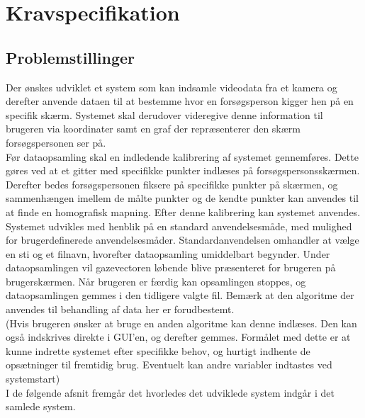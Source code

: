 \documentclass[rapport.tex]{subfiles}
\begin{document}
\section{Kravspecifikation}
\label{sec:kravspec}

	\subsection{Problemstillinger}
	Der ønskes udviklet et system som kan indsamle videodata fra et kamera og derefter anvende dataen til
	at bestemme hvor en forsøgsperson kigger hen på en specifik skærm. Systemet skal derudover videregive
	denne information til brugeren via koordinater samt en graf der repræsenterer den skærm forsøgspersonen
	ser på.
	\\
	\indent
	Før dataopsamling skal en indledende kalibrering af systemet gennemføres. Dette gøres ved at et gitter med
	specifikke punkter indlæses på forsøgspersonsskærmen. Derefter bedes forsøgspersonen fiksere på specifikke punkter
	på skærmen, og sammenhængen imellem de målte punkter og de kendte punkter kan anvendes til at finde en
	homografisk mapning. Efter denne kalibrering kan systemet anvendes.
	\\
	\indent
	Systemet udvikles med henblik på en standard anvendelsesmåde, med mulighed for brugerdefinerede anvendelsesmåder. 
	Standardanvendelsen omhandler at vælge en sti og et filnavn, hvorefter dataopsamling umiddelbart begynder.
	Under dataopsamlingen vil gazevectoren løbende blive præsenteret for brugeren på brugerskærmen. Når brugeren er 
	færdig kan opsamlingen stoppes, og dataopsamlingen gemmes i den tidligere valgte fil. Bemærk at den algoritme
	der anvendes til behandling af data her er forudbestemt.
	\\
	(Hvis brugeren ønsker at bruge en anden algoritme kan denne indlæses. Den kan også indskrives direkte i
	GUI'en, og derefter gemmes. Formålet med dette er at kunne indrette systemet efter specifikke behov, og
	hurtigt indhente de opsætninger til fremtidig brug. Eventuelt kan andre variabler indtastes ved systemstart) 
	\\
	\indent
	I de følgende afsnit fremgår det hvorledes det udviklede system indgår i det samlede system.
	
	
\end{document}
